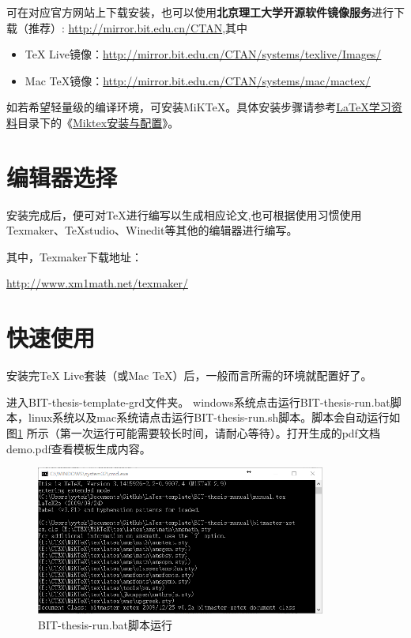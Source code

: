 可在对应官方网站上下载安装，也可以使用\textbf{北京理工大学开源软件镜像服务}进行下载（推荐）: \url{http://mirror.bit.edu.cn/CTAN},其中
\begin{itemize}
\item TeX Live镜像：\url{http://mirror.bit.edu.cn/CTAN/systems/texlive/Images/}
\item Mac TeX镜像：\url{http://mirror.bit.edu.cn/CTAN/systems/mac/mactex/}
\end{itemize}

如若希望轻量级的编译环境，可安装MiKTeX。具体安装步骤请参考\href{https://github.com/BIT-thesis/LaTeX-materials}{LaTeX学习资料}目录下的《\href{https://github.com/BIT-thesis/LaTeX-materials/raw/master/Miktex%E5%AE%89%E8%A3%85%E4%B8%8E%E9%85%8D%E7%BD%AE.pdf}{Miktex安装与配置}》。 

\section{编辑器选择}
安装完成后，便可对\TeX 进行编写以生成相应论文,也可根据使用习惯使用Texmaker、TeXstudio、Winedit等其他的编辑器进行编写。

其中，Texmaker下载地址：

\url{http://www.xm1math.net/texmaker/}

\section{快速使用}
\label{sec:process}

安装完TeX Live套装（或Mac TeX）后，一般而言所需的环境就配置好了。

进入BIT-thesis-template-grd文件夹。
windows系统点击运行BIT-thesis-run.bat脚本，linux系统以及mac系统请点击运行BIT-thesis-run.sh脚本。脚本会自动运行如图\ref{fig:run} 所示（第一次运行可能需要较长时间，请耐心等待）。打开生成的pdf文档demo.pdf查看模板生成内容。
 
\begin{figure}[!htp]
  \centering
  \includegraphics[width=0.85\textwidth]{figures/BIT-thesis-run}
  \caption{BIT-thesis-run.bat脚本运行}
  \label{fig:run}
\end{figure}


